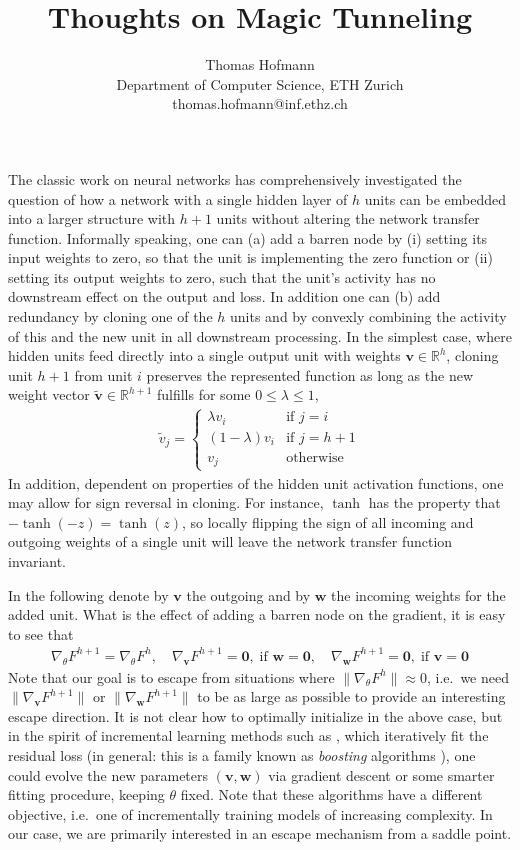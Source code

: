 \documentclass{article}
\title{
	Thoughts on Magic Tunneling 
}
\author{
	Thomas Hofmann \\[1mm] Department of Computer Science, ETH Zurich \\ thomas.hofmann@inf.ethz.ch
}
\renewcommand{\v}{{\mathbf v}}
\newcommand{\w}{{\mathbf w}}
\renewcommand{\Re}{{\mathbb R}}
\begin{document}
\maketitle 

The classic work on neural networks has comprehensively investigated the question of how a network with a single hidden layer of $h$ units can be embedded into a larger structure with $h+1$ units without altering the network transfer function. Informally speaking, one can (a) add a barren node by (i) setting its input weights to zero, so that the unit is implementing the zero function or (ii) setting its output weights to zero, such that the unit's activity has no downstream effect on the output and loss. In addition one can (b) add redundancy by cloning one of the $h$ units  and by convexly combining the activity of this and the new unit in all downstream processing. In the simplest case, where hidden units feed directly into a single output unit with weights $\v \in \Re^h$, cloning unit $h+1$ from unit $i$ preserves the represented function as long as the new weight vector $\tilde\v \in \Re^{h+1}$ fulfills for some $0 \leq \lambda  \leq 1$,
\begin{align}
\tilde v_j = 
	\begin{cases} 
		\lambda v_i & \text{if $j=i$} \\
		(1-\lambda) v_i & \text{if $j=h+1$} \\
		v_j & \text{otherwise} 
	\end{cases}
\end{align}
In addition, dependent on properties of the hidden unit activation functions, one may allow for sign reversal in cloning. For instance, $\tanh$ has the property that $-\tanh(-z)= \tanh(z)$, so locally flipping the sign of all incoming and outgoing  weights of a single unit will leave the network transfer function invariant. 

In the following denote by $\v$ the outgoing and by $\w$ the incoming weights for the added unit. What is the effect of adding a barren node on the gradient, it is easy to see that 
\begin{align} 
\nabla_\theta F^{h+1} = \nabla_\theta F^{h},\quad 
\nabla_\v F^{h+1} = \mathbf 0, \; \text{if $\w=\mathbf 0$}, \quad 
\nabla_\w F^{h+1} = \mathbf 0, \; \text{if $\v=\mathbf 0$}
\end{align}
Note that our goal is to escape from situations where $\| \nabla_\theta F^h \| \approx 0$, i.e.~we need $\| \nabla_\v F^{h+1}\|$ or 
$\| \nabla_\w F^{h+1}\|$ to be as large as possible to provide an interesting escape direction. It is not clear how to optimally initialize in the above case, but in the spirit of incremental learning methods such as \cite{breiman1993hinging}, which iteratively fit the residual loss (in general: this is a family known as \textit{boosting} algorithms \cite{friedman2000additive,buehlmann2006boosting,tutz2007boosting}), one could evolve the new parameters  $(\v,\w)$ via gradient descent or some smarter fitting procedure, keeping $\theta$ fixed. Note that these algorithms have a different objective, i.e.~one of incrementally training models of increasing complexity. In our case, we are primarily interested in an escape mechanism from a saddle point. 
\end{document}
